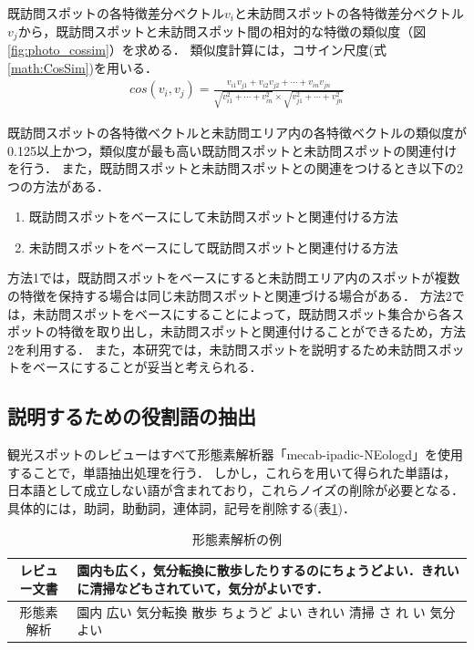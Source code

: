 \documentclass{deimj}
\begin{document}
既訪問スポットの各特徴差分ベクトル$v_i$と未訪問スポットの各特徴差分ベクトル$v_j$から，既訪問スポットと未訪問スポット間の相対的な特徴の類似度（図\ref{fig:photo_cossim}）を求める．
類似度計算には，コサイン尺度(式\ref{math:CosSim})を用いる．
\begin{eqnarray}
cos(v_i,v_j)=\frac{v_{i1}v_{j1}+v_{i2}v_{j2}+\cdots+v_{in}v_{jn}}
{\sqrt{v^2_{i1}+\cdots+v^2_{in}}\times\sqrt{v^2_{j1}+\cdots+v^2_{jn}}}
\label{math:CosSim}
\end{eqnarray}

既訪問スポットの各特徴ベクトルと未訪問エリア内の各特徴ベクトルの類似度が0.125以上かつ，類似度が最も高い既訪問スポットと未訪問スポットの関連付けを行う．
また，既訪問スポットと未訪問スポットとの関連をつけるとき以下の2つの方法がある．

\begin{enumerate}
  \item 既訪問スポットをベースにして未訪問スポットと関連付ける方法
  \item 未訪問スポットをベースにして既訪問スポットと関連付ける方法
\end{enumerate}

方法1では，既訪問スポットをベースにすると未訪問エリア内のスポットが複数の特徴を保持する場合は同じ未訪問スポットと関連づける場合がある．
方法2では，未訪問スポットをベースにすることによって，既訪問スポット集合から各スポットの特徴を取り出し，未訪問スポットと関連付けることができるため，方法2を利用する．
また，本研究では，未訪問スポットを説明するため未訪問スポットをベースにすることが妥当と考えられる．

\subsection{説明するための役割語の抽出}
\label{subsec:Feature vector generation by TFIDF}
観光スポットのレビューはすべて形態素解析器「mecab-ipadic-NEologd」を使用することで，単語抽出処理を行う．
しかし，これらを用いて得られた単語は，日本語として成立しない語が含まれており，これらノイズの削除が必要となる．
具体的には，助詞，助動詞，連体詞，記号を削除する(表\ref{table:mecab})．

\begin{table}[t]
  \caption{形態素解析の例}
  \label{table:mecab}
  \centering
    \begin{tabular}{c|p{}} \hline
      レビュー文書 & 園内も広く，気分転換に散歩したりするのにちょうどよい．きれいに清掃などもされていて，気分がよいです．\\
      \hline
      形態素解析 & 園内 広い 気分転換 散歩 ちょうど よい きれい 清掃 さ れ い 気分 よい\\
      \hline
    \end{tabular}
\end{table}
\end{document}
